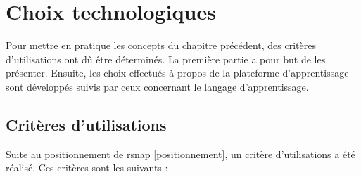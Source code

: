 \section{Choix technologiques}
\label{techno}
Pour mettre en pratique les concepts du chapitre précédent, des critères d'utilisations ont dû être déterminés. La première partie a pour but de les présenter. Ensuite, les choix effectués à propos de la plateforme d'apprentissage sont développés suivis par ceux concernant le langage d'apprentissage.

\subsection{Critères d'utilisations}
Suite au positionnement de \gls{rsnap} \ref{positionnement}, un critère d'utilisations a été réalisé. Ces critères sont les suivants :

